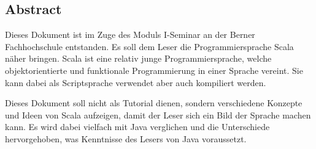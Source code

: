\subsection*{Abstract}

Dieses Dokument ist im Zuge des Moduls I-Seminar an der Berner
Fachhochschule entstanden. Es soll dem Leser die Programmiersprache
Scala näher bringen. Scala ist eine relativ junge Programmiersprache,
welche objektorientierte und funktionale Programmierung in einer Sprache
vereint. Sie kann dabei als Scriptsprache verwendet aber auch kompiliert
werden.

Dieses Dokument soll nicht als Tutorial dienen, sondern
verschiedene Konzepte und Ideen von Scala aufzeigen, damit der Leser
sich ein Bild der Sprache machen kann. Es wird dabei vielfach
mit Java verglichen und die Unterschiede hervorgehoben, was Kenntnisse 
des Lesers von Java voraussetzt.

